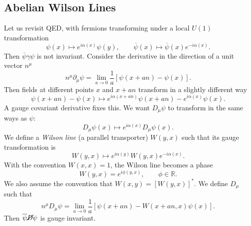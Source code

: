 \subsection{Abelian Wilson Lines}%
\label{sub:abelian_wilson_lines}

Let us revisit QED, with fermions transforming under a local $U(1)$ transformation
\begin{equation}
  \label{eq:20-trans}
  \psi(x) \mapsto e^{i \alpha(x)} \psi(y), \qquad \overline{\psi}{}(x) \mapsto \overline{\psi}{} (x) e^{-i \alpha(x)}.
\end{equation}
Then $\overline{\psi}{} \gamma \psi$ is not invariant.
Consider the derivative in the direction of a unit vector $n^{\mu}$
\begin{equation}
  n^{\mu} \partial_{\mu} \psi = \lim_{a \to 0} \frac{1}{a} \left[ \psi(x + an) - \psi(x)\right].
\end{equation}
Then fields at different points $x$ and $x + an$ transform in a slightly different way
\begin{equation}
  \psi(x + an) - \psi(x) \mapsto e^{i \alpha(x + an)} \psi(x + an) - e^{i \alpha(x)} \psi(x).
\end{equation}
A gauge covariant derivative fixes this.
We want $D_{\mu} \psi$ to transform in the same ways as $\psi$:
\begin{equation}
  D_{\mu}\psi(x) \mapsto e^{i \alpha(x)}D_{\mu} \psi(x).
\end{equation}
We define a \emph{Wilson line} (a parallel transporter) $W(y, x)$ such that its gauge transformation is
\begin{equation}
  \label{eq:20-wilsonline}
  W(y, x) \mapsto e^{i \alpha(y)} W(y, x) e^{-i \alpha(x)}.
\end{equation}
With the convention $W(x, x) = 1$, the Wilson line becomes a phase
\begin{equation}
  W(y, x) = e^{i \phi(y, x)}, \qquad \phi \in \mathbb{R}.
\end{equation}
We also assume the convention that $W(x, y) = [W(y, x)]^*$.
We define $D_{\mu}$ such that
\begin{equation}
  \label{eq:20-1}
  n^{\mu} D_{\mu} \psi = \lim_{a \to 0} \frac{1}{a} \left[ \psi(x + an) - W(x + an, x) \psi(x) \right] .
\end{equation}
Then $\overline{\psi}{} \cancel{D} \psi$ is gauge invariant.

